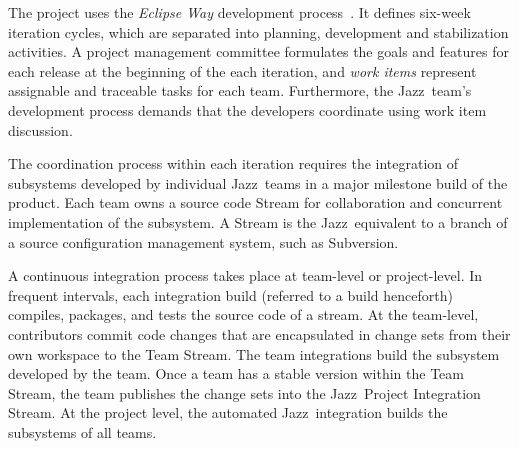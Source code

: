 \documentclass[12pt,oneside]{book}
\newcommand\tm{\texttrademark}
\newcommand{\et}[1]{\emph{#1}}
\begin{document}
The project uses the \emph{Eclipse Way} development process~\cite{frost:ieeesoftware:2007}.
It defines six-week iteration cycles, which are separated into planning,
development and stabilization activities. A project management committee
formulates the goals and features for each release at the beginning of the each
iteration, and \emph{work items} represent assignable and traceable tasks for each
team.
Furthermore, the Jazz\texttrademark\ team's development process demands that the developers coordinate using work item discussion. 

The coordination process within
each iteration requires the integration of subsystems developed by individual
Jazz\tm\ teams in a major milestone build of the product.
Each team owns a source code Stream for collaboration and concurrent
implementation of the subsystem. A Stream is the Jazz\tm\ equivalent to a branch of a
source configuration management system, such as Subversion.

A continuous integration process takes place at team-level or project-level. In
frequent intervals, each integration build (referred to a build henceforth)
compiles, packages, and tests the source code of a stream. At the team-level,
contributors commit code changes that are encapsulated in change sets from
their own workspace to the Team Stream. The team integrations build the
subsystem developed by the team. Once a team has a stable version within the Team
Stream, the team publishes the change sets into the Jazz\tm\ Project Integration
Stream. At the project level, the automated
Jazz\tm\ integration builds the subsystems of all teams. 

\end{document}
